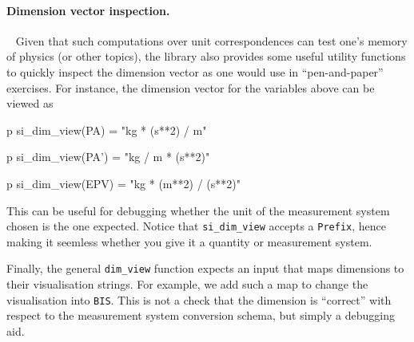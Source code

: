 \documentclass[runningheads,a4paper]{llncs}
\begin{document}
\paragraph*{Dimension vector inspection.}~
%
Given that such computations over unit correspondences can test one's memory of physics (or other topics), the library also provides some useful utility functions to quickly inspect the dimension vector as one would use in ``pen-and-paper'' exercises. For instance, the dimension vector for the variables above can be viewed as
%
\begin{vdmsl}[frame=none,basicstyle=\ttfamily\scriptsize]
    p si_dim_view(PA)
    = "kg * (s**2) / m" 

    p si_dim_view(PA')
    = "kg / m * (s**2)"

    p si_dim_view(EPV)
    = "kg * (m**2) / (s**2)"
\end{vdmsl}   
%
\noindent This can be useful for debugging whether the unit of the measurement system chosen is the one expected. Notice that \texttt{si\_dim\_view} accepts a \texttt{Prefix}, hence making it seemless whether you give it a quantity or measurement system. 

Finally, the general \texttt{dim\_view} function expects an input that maps dimensions to their visualisation strings. For example, we add such a map to change the visualisation into \texttt{BIS}. This is not a check that the dimension is ``correct'' with respect to the measurement system conversion schema, but simply a debugging aid.     
\end{document}
